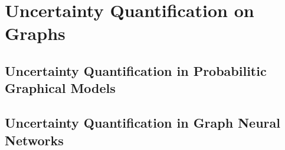 \section{Uncertainty Quantification on Graphs}
\subsection{Uncertainty Quantification in Probabilitic Graphical Models}

\subsection{Uncertainty Quantification in Graph Neural Networks}
